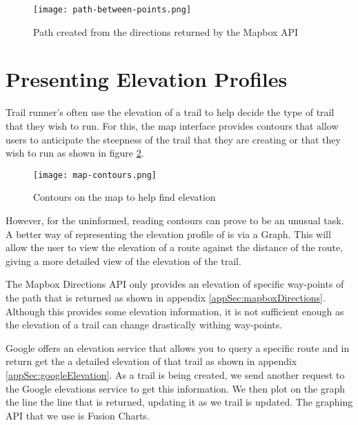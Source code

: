 \begin{figure}[htb!]
    \centering
    \texttt{[image: path-between-points.png]}
    \caption{Path created from the directions returned by the Mapbox API}
    \label{fig:PathCreated}
\end{figure}

\section{Presenting Elevation Profiles} \label{elevationProfile}
Trail runner's often use the elevation of a trail to help decide the type of trail that they wish to run. For this, the map interface provides contours that allow users to anticipate the steepness of the trail that they are creating or that they wish to run as shown in figure \ref{fig:MapContours}.

\begin{figure}[htb!]
    \centering
    \texttt{[image: map-contours.png]}
    \caption{Contours on the map to help find elevation}
    \label{fig:MapContours}
\end{figure}


However, for the uninformed, reading contours can prove to be an unusual task. A better way of representing the elevation profile of is via a Graph. This will allow the user to view the elevation of a route against the distance of the route, giving a more detailed view of the elevation of the trail.

The Mapbox Directions API only provides an elevation of specific way-points of the path that is returned as shown in appendix \ref{appSec:mapboxDirections}. Although this provides some elevation information, it is not sufficient enough as the elevation of a trail can change drastically withing way-points.

Google offers an elevation service that allows you to query a specific route and in return get the a detailed elevation of that trail as shown in appendix \ref{appSec:googleElevation}. As a trail is being created, we send another request to the Google elevations service to get this information. We then plot on the graph the line the line that is returned, updating it as we trail is updated. The graphing API that we use is Fusion Charts\cite{fusionCharts}.